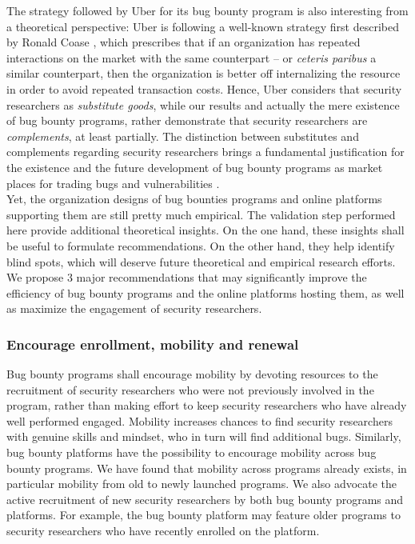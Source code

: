The strategy followed by Uber for its bug bounty program is also interesting from a theoretical perspective: Uber is following a well-known strategy first described by Ronald Coase \cite{coase1937}, which prescribes that if an organization has repeated interactions on the market with the same counterpart -- or {\it ceteris paribus} a similar counterpart, then the organization is better off internalizing the resource in order to avoid repeated transaction costs. Hence, Uber considers that security researchers as {\it substitute goods}, while our results and actually the mere existence of bug bounty programs, rather demonstrate that security researchers are {\it complements}, at least partially. The distinction between substitutes and complements regarding security researchers brings a fundamental justification for the existence and the future development of bug bounty programs as market places for trading bugs and vulnerabilities \cite{bohme2006comparison}. \\

Yet, the organization designs of bug bounties programs and online platforms supporting them are still pretty much empirical. The validation step performed here provide additional theoretical insights. On the one hand, these insights shall be useful to formulate recommendations. On the other hand, they help identify blind spots, which will deserve future theoretical and empirical research efforts. We propose 3 major recommendations that may significantly improve the efficiency of bug bounty programs and the online platforms hosting them, as well as maximize the engagement of security researchers. 

\subsubsection{Encourage enrollment, mobility and renewal}
Bug bounty programs shall encourage mobility by devoting resources to the recruitment of security researchers who were not previously involved in the program, rather than making effort to keep security researchers who have already well performed engaged. Mobility increases chances to find security researchers with genuine skills and mindset, who in turn will find additional bugs. Similarly, bug bounty platforms have the possibility to encourage mobility across bug bounty programs. We have found that mobility across programs already exists, in particular mobility from old to newly launched programs. We also advocate the active recruitment of new security researchers by both bug bounty programs and platforms. For example, the bug bounty platform may feature older programs to security researchers who have recently enrolled on the platform.

